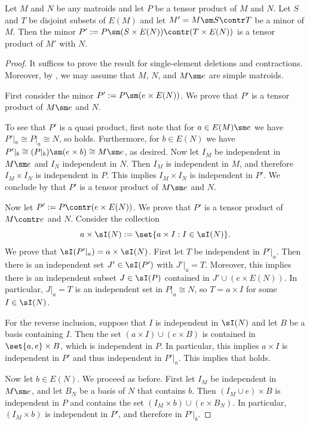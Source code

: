     \begin{proposition}\label{prop:tensorMinorClosed}
        Let $M$ and $N$ be any matroids and let $P$ be a tensor product of $M$ and $N$. Let $S$ and $T$ be disjoint subsets of $E(M)$ and let $M'= M\sm S\contr T$ be a minor of $M$. Then the minor $P':=P\sm (S\times E(N))\contr (T\times E(N))$ is a tensor product of $M'$ with $N$.
    \end{proposition}
    \begin{proof}
        It suffices to prove the result for single-element deletions and contractions. Moreover, by , we may assume that $M$, $N$, and $M\sm e$ are simple matroids.

        First consider the minor $P':=P\sm(e\times E(N))$. We prove that $P'$ is a tensor product of $M\sm e$ and $N$.
        
        To see that $P'$ is a quasi product, first note that for $a\in E(M)\sm e$ we have $P'|_a\cong P|_a\cong N$, so  holds. Furthermore, for $b\in E(N)$ we have $P'|_b\cong (P|_b)\sm (e\times b)\cong M\sm e$, as desired. Now let $I_M$ be independent in $M\sm e$ and $I_N$ independent in $N$. Then $I_M$ is independent in $M$, and therefore $I_M\times I_N$ is independent in $P$. This implies $I_M\times I_N$ is independent in $P'$. We conclude by  that $P'$ is a tensor product of $M\sm e$ and $N$.

        Now let $P':=P\contr (e\times E(N))$. We prove that $P'$ is a tensor product of $M\contr e$ and $N$. Consider the collection 
        $$a\times \sI(N):=\set{a\times I: I\in \sI(N)}.$$
        We prove that $\sI(P'|_a)= a\times \sI(N)$. First let $T$ be independent in $P'|_a$. Then there is an independent set $J'\in \sI(P')$ with $J'|_a=T$. Moreover, this implies there is an independent subset $J\in \sI(P)$ contained in $J'\cup (e\times E(N))$. In particular, $J|_a=T$ is an independent set in $P|_a\cong N$, so $T= a\times I$ for some $I\in \sI(N)$.

        For the reverse inclusion, suppose that $I$ is independent in $\sI(N)$ and let $B$ be a basis containing $I$. Then the set $(a\times I)\cup (e\times B)$ is contained in $\set{a,e}\times B$, which is independent in $P$. In particular, this implies $a\times I$ is independent in $P'$ and thus independent in $P'|_a$. This implies that  holds.

        Now let $b\in E(N)$. We proceed as before. First let $I_M$ be independent in $M\sm e$, and let $B_N$ be a basis of $N$ that contains $b$. Then $(I_M\cup e)\times B$ is independent in $P$ and contains the set $(I_M\times b)\cup (e\times B_N)$. In particular, $(I_M\times b)$ is independent in $P'$, and therefore in $P'|_b$.


\end{proof}
